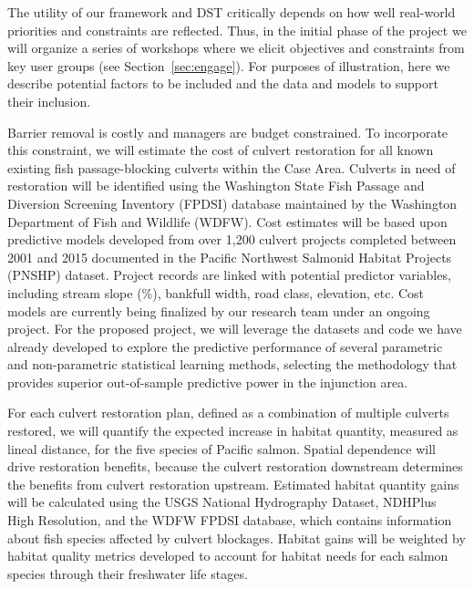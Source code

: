 \documentclass[12pt]{elsarticle}
\begin{document}
	The utility of our framework and DST critically depends on how well real-world priorities and constraints are reflected. Thus, in the initial phase of the project we will organize a series of workshops where we elicit objectives and constraints from key user groups (see Section~\ref{sec:engage}). For purposes of illustration, here we describe potential factors to be included and the data and models to support their inclusion.   
	
	Barrier removal is costly and managers are budget constrained. To incorporate this constraint, we will estimate the cost of culvert restoration for all known existing fish passage-blocking culverts within the Case Area. Culverts in need of restoration will be identified using the Washington State Fish Passage and Diversion Screening Inventory (FPDSI) database maintained by the Washington Department of Fish and Wildlife (WDFW). Cost estimates will be based upon predictive models developed from over 1,200 culvert projects completed between 2001 and 2015 documented in the Pacific Northwest Salmonid Habitat Projects (PNSHP) dataset. Project records are linked with potential predictor variables, including stream slope (\%), bankfull width, road class, elevation, etc. Cost models are currently being finalized by our research team under an ongoing project. For the proposed project, we will leverage the datasets and code we have already developed to explore the predictive performance of several parametric and non-parametric statistical learning methods, selecting the methodology that provides superior out-of-sample predictive power in the injunction area.
	
	For each culvert restoration plan, defined as a combination of multiple culverts restored, we will quantify the expected increase in habitat quantity, measured as lineal distance, for the five species of Pacific salmon. Spatial dependence will drive restoration benefits, because the culvert restoration downstream determines the benefits from culvert restoration upstream. Estimated habitat quantity gains will be calculated using the USGS National Hydrography Dataset, NDHPlus High Resolution, and the WDFW FPDSI database, which contains information about fish species affected by culvert blockages. Habitat gains will be weighted by habitat quality metrics developed to account for habitat needs for each salmon species through their freshwater life stages. 
	
\end{document}
